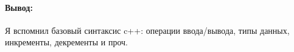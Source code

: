 \paragraph{Вывод:}
Я вспомнил базовый синтаксис c++: операции ввода/вывода, типы данных, инкременты, декременты и проч.